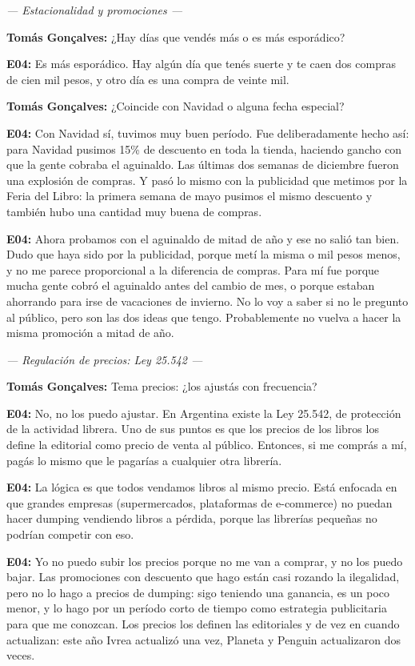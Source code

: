 \noindent\textit{--- Estacionalidad y promociones ---}

\noindent\textbf{Tomás Gonçalves:} ¿Hay días que vendés más o es más esporádico?

\noindent\textbf{E04:} Es más esporádico. Hay algún día que tenés suerte y te caen dos compras de cien mil pesos, y otro día es una compra de veinte mil.

\noindent\textbf{Tomás Gonçalves:} ¿Coincide con Navidad o alguna fecha especial?

\noindent\textbf{E04:} Con Navidad sí, tuvimos muy buen período. Fue deliberadamente hecho así: para Navidad pusimos 15\% de descuento en toda la tienda, haciendo gancho con que la gente cobraba el aguinaldo. Las últimas dos semanas de diciembre fueron una explosión de compras. Y pasó lo mismo con la publicidad que metimos por la Feria del Libro: la primera semana de mayo pusimos el mismo descuento y también hubo una cantidad muy buena de compras.

\noindent\textbf{E04:} Ahora probamos con el aguinaldo de mitad de año y ese no salió tan bien. Dudo que haya sido por la publicidad, porque metí la misma o mil pesos menos, y no me parece proporcional a la diferencia de compras. Para mí fue porque mucha gente cobró el aguinaldo antes del cambio de mes, o porque estaban ahorrando para irse de vacaciones de invierno. No lo voy a saber si no le pregunto al público, pero son las dos ideas que tengo. Probablemente no vuelva a hacer la misma promoción a mitad de año.

\noindent\textit{--- Regulación de precios: Ley 25.542 ---}

\noindent\textbf{Tomás Gonçalves:} Tema precios: ¿los ajustás con frecuencia?

\noindent\textbf{E04:} No, no los puedo ajustar. En Argentina existe la Ley 25.542, de protección de la actividad librera. Uno de sus puntos es que los precios de los libros los define la editorial como precio de venta al público. Entonces, si me comprás a mí, pagás lo mismo que le pagarías a cualquier otra librería.

\noindent\textbf{E04:} La lógica es que todos vendamos libros al mismo precio. Está enfocada en que grandes empresas (supermercados, plataformas de e-commerce) no puedan hacer dumping vendiendo libros a pérdida, porque las librerías pequeñas no podrían competir con eso.

\noindent\textbf{E04:} Yo no puedo subir los precios porque no me van a comprar, y no los puedo bajar. Las promociones con descuento que hago están casi rozando la ilegalidad, pero no lo hago a precios de dumping: sigo teniendo una ganancia, es un poco menor, y lo hago por un período corto de tiempo como estrategia publicitaria para que me conozcan. Los precios los definen las editoriales y de vez en cuando actualizan: este año Ivrea actualizó una vez, Planeta y Penguin actualizaron dos veces.

